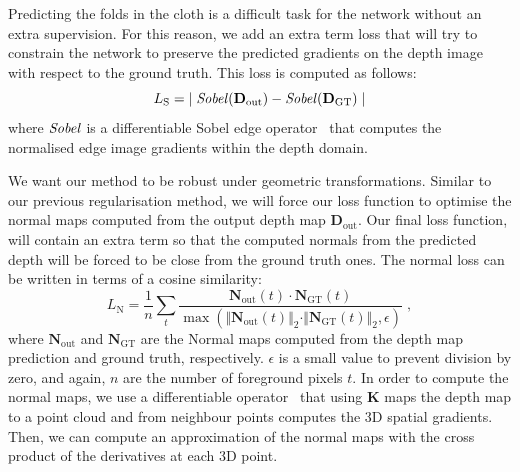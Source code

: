 \vspace{1mm}
 Predicting the folds in the cloth is a difficult task for the network without an extra supervision. For this reason, we add an extra term loss that will try to constrain the network to preserve the predicted gradients on the depth image with respect to the ground truth. This loss is computed as follows:
\begin{equation}
    L_\textrm{S} = {\mid \text{\textit{Sobel}}(\mathbf{D}_{\textrm{out}}) - \text{\textit{Sobel}}(\mathbf{D}_{\textrm{GT}}) \mid}
\end{equation}
where $\text{\textit{Sobel}}$ is a differentiable Sobel edge operator~\cite{eriba2020kornia} that computes the normalised edge image gradients within the depth domain.

\vspace{1mm}
 We want our method to be robust under geometric transformations. Similar to our previous regularisation method, we will force our loss function to optimise the normal maps computed from the output depth map $\mathbf{D}_{\textrm{out}}$. Our final loss function, will contain an extra term so that the computed normals from the predicted depth will be forced to be close from the ground truth ones. The normal loss can be written in terms of a cosine similarity:
\begin{equation}
        L_\textrm{N} = \frac{1}{n} \sum_{t} \dfrac{\mathbf{N}_{\textrm{out}}(t) \cdot \mathbf{N}_{\textrm{GT}}(t)}{\max(\Vert \mathbf{N}_{\textrm{out}}(t) \Vert _2 \cdot \Vert \mathbf{N}_{\textrm{GT}}(t) \Vert _2, \epsilon)}\;,
\end{equation}
where $\mathbf{N}_{\textrm{out}}$ and $\mathbf{N}_{\textrm{GT}}$ are the Normal maps computed from the depth map prediction and ground truth, respectively. $\epsilon$ is a small value to prevent division by zero, and again, $n$ are the number of foreground pixels $t$. In order to compute the normal maps, we  use a differentiable operator~\cite{eriba2019kornia, eriba2020kornia} that using $\textbf{K}$ maps the depth map to a point cloud and from neighbour points computes the 3D spatial gradients. Then, we can compute an approximation of the normal maps with the cross product of the derivatives at each 3D point.

